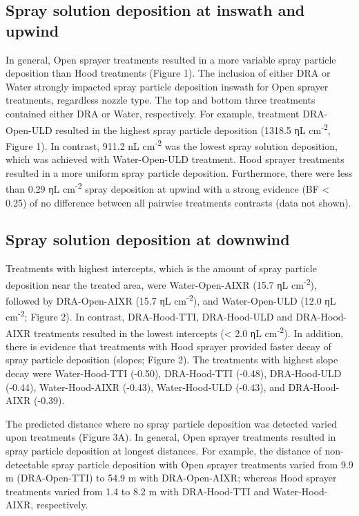 \documentclass[
  12pt,
  a4paper,
]{article}
\begin{document}
\hypertarget{spray-solution-deposition-at-inswath-and-upwind}{%
\subsection{Spray solution deposition at inswath and
upwind}\label{spray-solution-deposition-at-inswath-and-upwind}}

In general, Open sprayer treatments resulted in a more variable spray
particle deposition than Hood treatments (Figure 1). The inclusion of
either DRA or Water strongly impacted spray particle deposition inswath
for Open sprayer treatments, regardless nozzle type. The top and bottom
three treatments contained either DRA or Water, respectively. For
example, treatment DRA-Open-ULD resulted in the highest spray particle
deposition (1318.5 ηL cm\textsuperscript{-2}, Figure 1). In contrast,
911.2 nL cm\textsuperscript{-2} was the lowest spray solution
deposition, which was achieved with Water-Open-ULD treatment. Hood
sprayer treatments resulted in a more uniform spray particle deposition.
Furthermore, there were less than 0.29 ηL cm\textsuperscript{-2} spray
deposition at upwind with a strong evidence (BF \textless{} 0.25) of no
difference between all pairwise treatments contrasts (data not shown).

\hypertarget{spray-solution-deposition-at-downwind-1}{%
\subsection{Spray solution deposition at
downwind}\label{spray-solution-deposition-at-downwind-1}}

Treatments with highest intercepts, which is the amount of spray
particle deposition near the treated area, were Water-Open-AIXR (15.7 ηL
cm\textsuperscript{-2}), followed by DRA-Open-AIXR (15.7 ηL
cm\textsuperscript{-2}), and Water-Open-ULD (12.0 ηL
cm\textsuperscript{-2}; Figure 2). In contrast, DRA-Hood-TTI,
DRA-Hood-ULD and DRA-Hood-AIXR treatments resulted in the lowest
intercepts (\textless{} 2.0 ηL cm\textsuperscript{-2}). In addition,
there is evidence that treatments with Hood sprayer provided faster
decay of spray particle deposition (slopes; Figure 2). The treatments
with highest slope decay were Water-Hood-TTI (-0.50), DRA-Hood-TTI
(-0.48), DRA-Hood-ULD (-0.44), Water-Hood-AIXR (-0.43), Water-Hood-ULD
(-0.43), and DRA-Hood-AIXR (-0.39).

The predicted distance where no spray particle deposition was detected
varied upon treatments (Figure 3A). In general, Open sprayer treatments
resulted in spray particle deposition at longest distances. For example,
the distance of non-detectable spray particle deposition with Open
sprayer treatments varied from 9.9 m (DRA-Open-TTI) to 54.9 m with
DRA-Open-AIXR; whereas Hood sprayer treatments varied from 1.4 to 8.2 m
with DRA-Hood-TTI and Water-Hood-AIXR, respectively.
\end{document}
